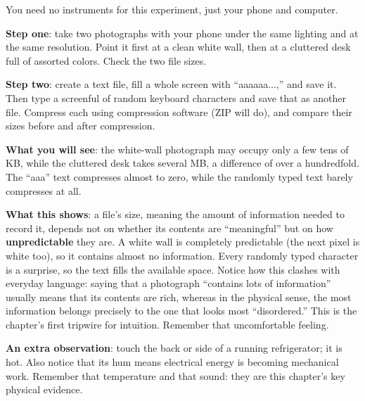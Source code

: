 \begin{experiment}
You need no instruments for this experiment, just your phone and computer.

\textbf{Step one}: take two photographs with your phone under the same lighting and at the same resolution. Point it first at a clean white wall, then at a cluttered desk full of assorted colors. Check the two file sizes.

\textbf{Step two}: create a text file, fill a whole screen with ``aaaaaa...,'' and save it. Then type a screenful of random keyboard characters and save that as another file. Compress each using compression software (ZIP will do), and compare their sizes before and after compression.

\textbf{What you will see}: the white-wall photograph may occupy only a few tens of KB, while the cluttered desk takes several MB, a difference of over a hundredfold. The ``aaa'' text compresses almost to zero, while the randomly typed text barely compresses at all.

\textbf{What this shows}: a file's size, meaning the amount of information needed to record it, depends not on whether its contents are ``meaningful'' but on how \textbf{unpredictable} they are. A white wall is completely predictable (the next pixel is white too), so it contains almost no information. Every randomly typed character is a surprise, so the text fills the available space. Notice how this clashes with everyday language: saying that a photograph ``contains lots of information'' usually means that its contents are rich, whereas in the physical sense, the most information belongs precisely to the one that looks most ``disordered.'' This is the chapter's first tripwire for intuition. Remember that uncomfortable feeling.

\textbf{An extra observation}: touch the back or side of a running refrigerator; it is hot. Also notice that its hum means electrical energy is becoming mechanical work. Remember that temperature and that sound: they are this chapter's key physical evidence.
\end{experiment}


